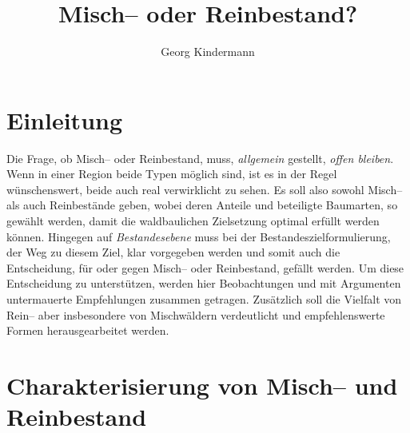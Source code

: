 \documentclass[twocolumn]{scrartcl}
\title{Misch-- oder Reinbestand?}
\author{Georg Kindermann}
\begin{document}

\tableofcontents

\section{Einleitung}

Die Frage, ob Misch-- oder Reinbestand, muss, \emph{allgemein} gestellt,
\emph{offen bleiben}. Wenn in einer Region beide Typen möglich sind, ist es in
der Regel wünschenswert, beide auch real verwirklicht zu sehen. Es soll also
sowohl Misch-- als auch Reinbestände geben, wobei deren Anteile und beteiligte
Baumarten, so gewählt werden, damit die waldbaulichen Zielsetzung optimal
erfüllt werden können. Hingegen auf \emph{Bestandesebene} muss bei der
Bestandeszielformulierung, der Weg zu diesem Ziel, klar vorgegeben werden und
somit auch die Entscheidung, für oder gegen Misch-- oder Reinbestand, gefällt
werden. Um diese Entscheidung zu unterstützen, werden hier Beobachtungen und mit
Argumenten untermauerte Empfehlungen zusammen getragen. Zusätzlich soll die
Vielfalt von Rein-- aber insbesondere von Mischwäldern verdeutlicht und
empfehlenswerte Formen herausgearbeitet werden.

\section{Charakterisierung von Misch-- und Reinbestand}
\label{sec:charakterisierung}
\end{document}
